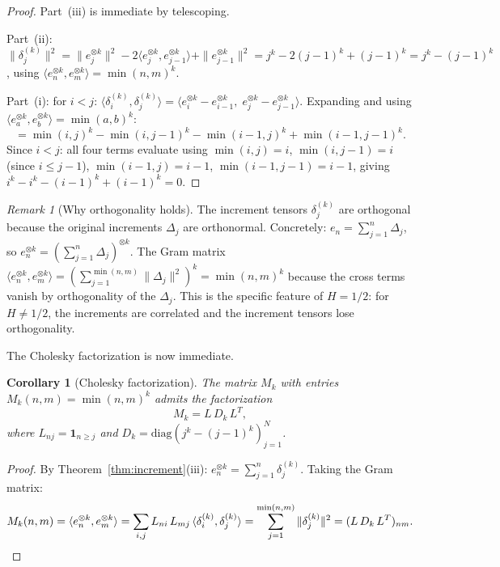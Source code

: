 \documentclass[11pt,a4paper]{article}
\theoremstyle{plain}
\newtheorem{corollary}[theorem]{Corollary}
\theoremstyle{definition}
\theoremstyle{remark}
\newtheorem{remark}[theorem]{Remark}
\begin{document}
\begin{proof}
Part~(iii) is immediate by telescoping.

Part~(ii): $\|\delta_j^{(k)}\|^2
= \|e_j^{\otimes k}\|^2
- 2\langle e_j^{\otimes k}, e_{j-1}^{\otimes k}\rangle
+ \|e_{j-1}^{\otimes k}\|^2
= j^k - 2(j{-}1)^k + (j{-}1)^k
= j^k - (j{-}1)^k$,
using $\langle e_n^{\otimes k}, e_m^{\otimes k}\rangle
= \min(n,m)^k$.

Part~(i): for $i < j$:
$\langle \delta_i^{(k)}, \delta_j^{(k)} \rangle
= \langle e_i^{\otimes k} - e_{i-1}^{\otimes k},\;
  e_j^{\otimes k} - e_{j-1}^{\otimes k} \rangle$.
Expanding and using
$\langle e_a^{\otimes k}, e_b^{\otimes k}\rangle
= \min(a,b)^k$:
\[
  = \min(i,j)^k - \min(i,j{-}1)^k
  - \min(i{-}1,j)^k + \min(i{-}1,j{-}1)^k.
\]
Since $i < j$: all four terms evaluate using
$\min(i,j) = i$, $\min(i,j{-}1) = i$ (since
$i \leq j{-}1$), $\min(i{-}1,j) = i{-}1$,
$\min(i{-}1,j{-}1) = i{-}1$, giving
$i^k - i^k - (i{-}1)^k + (i{-}1)^k = 0$.
\end{proof}

\begin{remark}[Why orthogonality holds]
\label{rem:why-orth}
The increment tensors $\delta_j^{(k)}$ are orthogonal
because the original increments $\Delta_j$ are
orthonormal.  Concretely:
$e_n = \sum_{j=1}^n \Delta_j$, so
$e_n^{\otimes k} = (\sum_{j=1}^n \Delta_j)^{\otimes k}$.
The Gram matrix
$\langle e_n^{\otimes k}, e_m^{\otimes k}\rangle
= (\sum_{j=1}^{\min(n,m)} \|\Delta_j\|^2)^k = \min(n,m)^k$
because the cross terms vanish by orthogonality of the
$\Delta_j$.  This is the specific feature of $H = 1/2$:
for $H \neq 1/2$, the increments are correlated and the
increment tensors lose orthogonality.
\end{remark}

The Cholesky factorization is now immediate.

\begin{corollary}[Cholesky factorization]
\label{cor:cholesky}
The matrix $M_k$ with entries $M_k(n,m) = \min(n,m)^k$
admits the factorization
\begin{equation}\label{eq:cholesky}
  M_k = L\,D_k\,L^T,
\end{equation}
where $L_{nj} = \mathbf{1}_{n \geq j}$ and
$D_k = \mathrm{diag}(j^k - (j{-}1)^k)_{j=1}^N$.
\end{corollary}

\begin{proof}
By Theorem~\ref{thm:increment}(iii):
$e_n^{\otimes k} = \sum_{j=1}^n \delta_j^{(k)}$.
Taking the Gram matrix:
\[
  M_k(n,m) = \langle e_n^{\otimes k}, e_m^{\otimes k}\rangle
  = \sum_{i,j} L_{ni}\,L_{mj}\,
    \langle \delta_i^{(k)}, \delta_j^{(k)} \rangle
  = \sum_{j=1}^{\min(n,m)} \|\delta_j^{(k)}\|^2
  = (L\,D_k\,L^T)_{nm}.
  \qedhere
\]
\end{proof}
\end{document}
